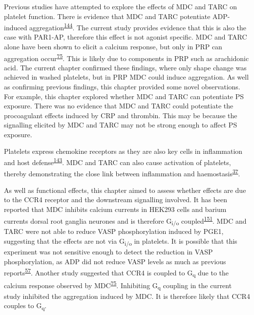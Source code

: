 \documentclass[11pt,twoside]{bristolthesis}
\begin{document}
Previous studies have attempted to explore the effects of MDC and TARC on platelet function. There is evidence that MDC and TARC potentiate ADP-induced aggregation\textsuperscript{\protect\hyperlink{ref-Gear2001}{144}}. The current study provides evidence that this is also the case with PAR1-AP, therefore this effect is not agonist specific. MDC and TARC alone have been shown to elicit a calcium response, but only in PRP can aggregation occur\textsuperscript{\protect\hyperlink{ref-Kowalska2000}{75}}. This is likely due to components in PRP such as arachidonic acid. The current chapter confirmed these findings, where only shape change was achieved in washed platelets, but in PRP MDC could induce aggregation. As well as confirming previous findings, this chapter provided some novel observations. For example, this chapter explored whether MDC and TARC can potentiate PS exposure. There was no evidence that MDC and TARC could potentiate the procoagulant effects induced by CRP and thrombin. This may be because the signalling elicited by MDC and TARC may not be strong enough to affect PS exposure.

Platelets express chemokine receptors as they are also key cells in inflammation and host defense\textsuperscript{\protect\hyperlink{ref-Clemetson2000}{143}}. MDC and TARC can also cause activation of platelets, thereby demonstrating the close link between inflammation and haemostasis\textsuperscript{\protect\hyperlink{ref-Gear2003}{37}}.

As well as functional effects, this chapter aimed to assess whether effects are due to the CCR4 receptor and the downstream signalling involved. It has been reported that MDC inhibits calcium currents in HEK293 cells and barium currents dorsal root ganglia neurones and is therefore G\textsubscript{i/o} coupled\textsuperscript{\protect\hyperlink{ref-Oh2002}{151}}. MDC and TARC were not able to reduce VASP phosphorylation induced by PGE1, suggesting that the effects are not via G\textsubscript{i/o} in platelets. It is possible that this experiment was not sensitive enough to detect the reduction in VASP phosphorylation, as ADP did not reduce VASP levels as much as previous reports\textsuperscript{\protect\hyperlink{ref-Hezard2005}{57}}. Another study suggested that CCR4 is coupled to G\textsubscript{q} due to the calcium response observed by MDC\textsuperscript{\protect\hyperlink{ref-Kowalska2000}{75}}. Inhibiting G\textsubscript{q} coupling in the current study inhibited the aggregation induced by MDC. It is therefore likely that CCR4 couples to G\textsubscript{q}.
\end{document}

